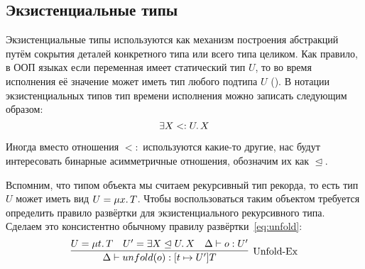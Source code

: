\subsection{Экзистенциальные типы} \label{subsec:existentials}

Экзистенциальные типы используются как механизм построения абстракций путём сокрытия деталей конкретного типа или всего типа целиком.
Как правило, в ООП языках если переменная имеет статический тип $U$, то во время исполнения её значение может иметь тип любого подтипа $U$ ().
В нотации экзистенциальных типов тип времени исполнения можно записать следующим образом:
\[
    \exists X <: U \ldotp X
\]

Иногда вместо отношения $<:$ используются какие-то другие, нас будут интересовать бинарные асимметричные отношения, обозначим их как $\trianglelefteq$.

Вспомним, что типом объекта мы считаем рекурсивный тип рекорда, то есть тип $U$ может иметь вид $U = \mu x \ldotp T$.
Чтобы воспользоваться таким объектом требуется определить правило развёртки для экзистенциального рекурсивного типа.
Сделаем это консистентно обычному правилу развёртки~\eqref{eq:unfold}:
\begin{equation}
    \label{eq:unfold-ex}
    \infer[\text{Unfold-Ex}]{
        \Delta \vdash unfold(o) : [t \mapsto U']T
    }{
        U = \mu t \ldotp T
        &
        U' = \exists X \trianglelefteq U \ldotp X
        &
        \Delta \vdash o : U'
    }
\end{equation}
